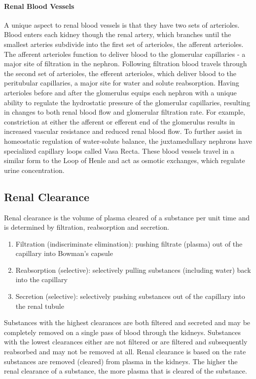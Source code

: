 \paragraph{Renal Blood Vessels}
A unique aspect to renal blood vessels is that they have two sets of arterioles. Blood enters each kidney though the renal artery, which branches until the smallest arteries subdivide into the first set of arterioles, the afferent arterioles. The afferent arterioles function to deliver blood to the glomerular capillaries - a major site of filtration in the nephron. Following filtration blood travels through the second set of arterioles, the efferent arterioles, which deliver blood to the peritubular capillaries, a major site for water and solute reabsorption. Having arterioles before and after the glomerulus equips each nephron with a unique ability to regulate the hydrostatic pressure of the glomerular capillaries, resulting in changes to both renal blood flow and glomerular filtration rate. For example, constriction at either the afferent or efferent end of the glomerulus results in increased vascular resistance and reduced renal blood flow.
To further assist in homeostatic regulation of water-solute balance, the juxtamedullary nephrons have specialized capillary loops called Vasa Recta. These blood vessels travel in a similar form to the Loop of Henle and act as osmotic exchanges, which regulate urine concentration. 


\subsection{Renal Clearance}

Renal clearance is the volume of plasma cleared of a substance per unit time and is determined by filtration, reabsorption and secretion. 

\begin{enumerate}
    \item Filtration (indiscriminate elimination): pushing filtrate (plasma) out of the capillary into Bowman's capsule
    \item Reabsorption (selective): selectively pulling substances (including water) back into the capillary
    \item Secretion (selective): selectively pushing substances out of the capillary into the renal tubule
\end{enumerate}

Substances with the highest clearances are both filtered and secreted and may be completely removed on a single pass of blood through the kidneys. Substances with the lowest clearances either are not filtered or are filtered and subsequently reabsorbed and may not be removed at all. Renal clearance is based on the rate substances are removed (cleared) from plasma in the kidneys. The higher the renal clearance of a substance, the more plasma that is cleared of the substance. 

